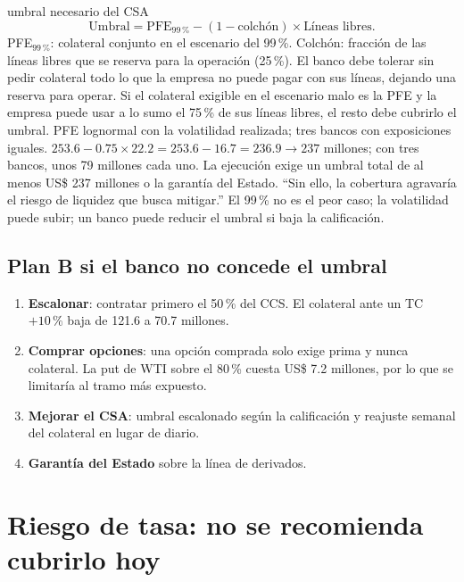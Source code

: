 \begin{ficha}{umbral necesario del CSA}
\[ \text{Umbral}=\text{PFE}_{99\,\%}-(1-\text{colchón})\times\text{Líneas libres}. \]
 PFE$_{99\,\%}$: colateral conjunto en el escenario del 99\,\%. Colchón: fracción de las líneas libres que se reserva para la operación (25\,\%).
 El banco debe tolerar sin pedir colateral todo lo que la empresa no puede pagar con sus líneas, dejando una reserva para operar.
 Si el colateral exigible en el escenario malo es la PFE y la empresa puede usar a lo sumo el 75\,\% de sus líneas libres, el resto debe cubrirlo el umbral.
 PFE lognormal con la volatilidad realizada; tres bancos con exposiciones iguales.
 $253.6-0.75\times22.2=253.6-16.7=236.9\to237$ millones; con tres bancos, unos 79 millones cada uno.
 La ejecución exige un umbral total de al menos US\$ 237 millones o la garantía del Estado. \enquote{Sin ello, la cobertura agravaría el riesgo de liquidez que busca mitigar.}
 El 99\,\% no es el peor caso; la volatilidad puede subir; un banco puede reducir el umbral si baja la calificación.
\end{ficha}

\subsection{Plan B si el banco no concede el umbral}

\begin{enumerate}
\item[(a)] \textbf{Escalonar}: contratar primero el 50\,\% del CCS. El colateral ante un TC $+10\,\%$ baja de 121.6 a 70.7 millones.
\item[(b)] \textbf{Comprar opciones}: una opción comprada solo exige prima y nunca colateral. La put de WTI sobre el 80\,\% cuesta US\$ 7.2 millones, por lo que se limitaría al tramo más expuesto.
\item[(c)] \textbf{Mejorar el CSA}: umbral escalonado según la calificación y reajuste semanal del colateral en lugar de diario.
\item[(d)] \textbf{Garantía del Estado} sobre la línea de derivados.
\end{enumerate}

\section{Riesgo de tasa: no se recomienda cubrirlo hoy}

